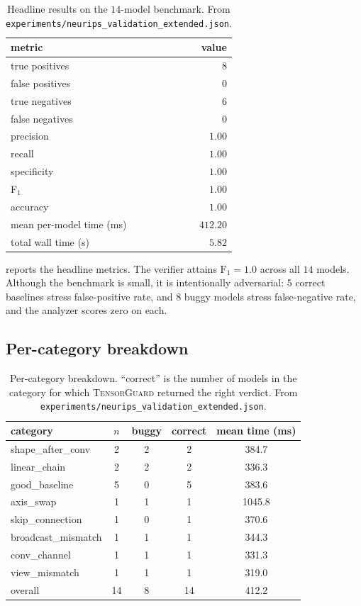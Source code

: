 \documentclass{article}
\theoremstyle{definition}
\begin{document}
\begin{table}[t]
\centering\small
\caption{Headline results on the $14$-model benchmark.
From \texttt{experiments/neurips\_validation\_extended.json}.}
\label{tab:headline}
\begin{tabular}{lr}
\toprule
metric & value \\
\midrule
true positives  & $8$  \\
false positives & $0$  \\
true negatives  & $6$  \\
false negatives & $0$  \\
\midrule
precision & $1.00$ \\
recall    & $1.00$ \\
specificity & $1.00$ \\
F$_1$       & $1.00$ \\
accuracy  & $1.00$ \\
\midrule
mean per-model time (ms) & $412.20$ \\
total wall time (s)      & $5.82$ \\
\bottomrule
\end{tabular}
\end{table}

 reports the headline metrics. The verifier
attains $\mathrm{F}_1=1.0$ across all $14$ models. Although the
benchmark is small, it is intentionally adversarial: $5$ correct
baselines stress false-positive rate, and $8$ buggy models stress
false-negative rate, and the analyzer scores zero on each.

\subsection{Per-category breakdown}\label{sec:by-category}

\begin{table}[t]
\centering\small
\caption{Per-category breakdown. ``correct'' is the number of models
in the category for which \textsc{TensorGuard} returned the right
verdict. From \texttt{experiments/neurips\_validation\_extended.json}.}
\label{tab:by-category}
\begin{tabular}{lcccc}
\toprule
category & $n$ & buggy & correct & mean time (ms) \\
\midrule
\textsf{shape\_after\_conv}    & 2 & 2 & 2 & 384.7 \\
\textsf{linear\_chain}         & 2 & 2 & 2 & 336.3 \\
\textsf{good\_baseline}        & 5 & 0 & 5 & 383.6 \\
\textsf{axis\_swap}            & 1 & 1 & 1 & 1045.8 \\
\textsf{skip\_connection}      & 1 & 0 & 1 & 370.6 \\
\textsf{broadcast\_mismatch}   & 1 & 1 & 1 & 344.3 \\
\textsf{conv\_channel}         & 1 & 1 & 1 & 331.3 \\
\textsf{view\_mismatch}        & 1 & 1 & 1 & 319.0 \\
\midrule
overall & 14 & 8 & 14 & 412.2 \\
\bottomrule
\end{tabular}
\end{table}
\end{document}

